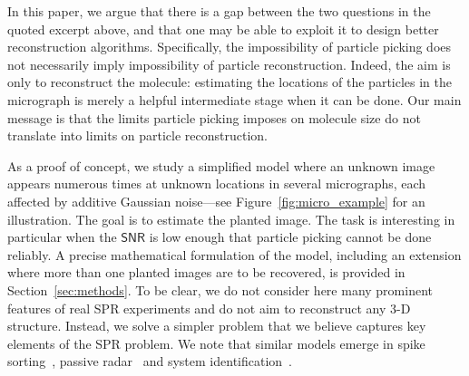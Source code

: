 \documentclass[english,11pt]{article}
\newcommand{\1}{\mathbf{1}}
\newcommand{\TODO}[1]{{\color{red}{[#1]}}}
\numberwithin{equation}{section}
\theoremstyle{plain}
\theoremstyle{definition}
\theoremstyle{remark}
\theoremstyle{plain}
\theoremstyle{remark}
\theoremstyle{plain}
\theoremstyle{plain}
\newcommand{\SNR}{\ensuremath{\textsf{SNR}}}
\begin{document}
In this paper, we argue that there is a gap between the two questions in the quoted excerpt above, and that one may be able to exploit it to design better reconstruction algorithms.
Specifically, the impossibility of particle picking does not necessarily imply impossibility of particle reconstruction.
Indeed, the aim is only to reconstruct the molecule: estimating the locations of the particles in the micrograph is merely a helpful intermediate stage when it can be done. Our main message is that the limits particle picking imposes on molecule size do not translate into limits on particle reconstruction.

As a proof of concept, we study a simplified model where an unknown image appears numerous times at unknown locations in several micrographs, each affected by additive Gaussian noise---see Figure~\ref{fig:micro_example} for an illustration.
The goal is to estimate the planted image. The task is interesting in particular when the $\SNR$ is low enough that particle picking cannot be done reliably.
A precise mathematical formulation of the model, including an extension where more than one planted images are to be recovered, is provided in Section~\ref{sec:methods}.
To be clear, we do not consider here many prominent features of real SPR experiments and do not aim to reconstruct any 3-D structure. Instead, we solve a simpler problem that we believe captures key elements of the SPR problem. We note that similar models emerge in spike sorting~\cite{lewicki1998review}, passive radar~\cite{gogineni2017passive} and system identification~\cite{ljung1998system}.
\end{document}
